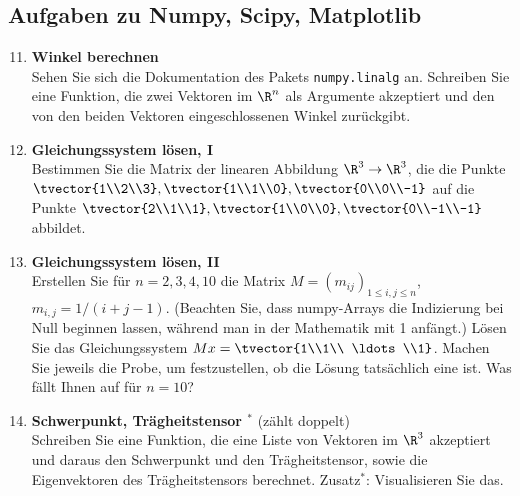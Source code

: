 \subsection*{Aufgaben zu Numpy, Scipy, Matplotlib}
\begin{enumerate}[1.]
\setcounter{enumi}{10}

\item \textbf{Winkel berechnen}\\
Sehen Sie sich die Dokumentation des Pakets \texttt{numpy.linalg} an.
Schreiben Sie eine Funktion, die zwei Vektoren im $\R^n$ als Argumente
akzeptiert und den von den beiden Vektoren eingeschlossenen Winkel zurückgibt.

\item \textbf{Gleichungssystem  lösen, I}\\
Bestimmen Sie die Matrix der linearen Abbildung $\R^3\to \R^3$, die
die Punkte $\tvector{1\\2\\3},\tvector{1\\1\\0},\tvector{0\\0\\-1}$ auf die
Punkte $\tvector{2\\1\\1},\tvector{1\\0\\0},\tvector{0\\-1\\-1}$ abbildet.

\item \textbf{Gleichungssystem lösen, II}\\
Erstellen Sie für $n=2,3,4,10$ die Matrix $M=(m_{ij})_{1\leq i,j\leq n}$, $m_{i,j}=1/(i+j-1)$. (Beachten
Sie, dass numpy-Arrays die Indizierung bei Null beginnen lassen, während man 
in der Mathematik mit 1 anfängt.)  Lösen Sie das Gleichungssystem $Mx=\tvector{1\\1\\ \ldots \\1}$.
Machen Sie jeweils die Probe, um festzustellen, ob die Lösung tatsächlich eine ist. Was fällt
Ihnen auf für $n=10$? 

\item \textbf{Schwerpunkt, Trägheitstensor $^*$} (zählt doppelt)\\
Schreiben Sie eine Funktion, die eine Liste von Vektoren im $\R^3$ akzeptiert
und daraus den Schwerpunkt und  den Trägheitstensor, sowie
die Eigenvektoren des Trägheitstensors berechnet. Zusatz$^*$:  Visualisieren Sie das.


\end{enumerate}
